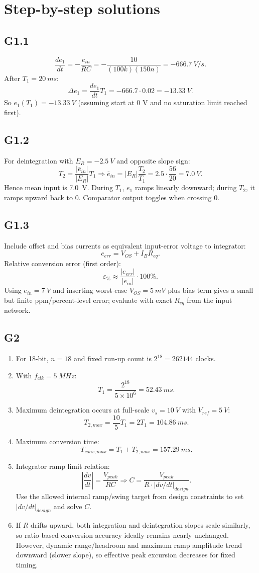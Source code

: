 \documentclass[12pt,a4paper]{article}
\begin{document}
\section{Step-by-step solutions}
\subsection{G1.1}
\[
\frac{de_1}{dt}=-\frac{e_{in}}{RC}=-\frac{10}{(100k)(150n)}=-\SI{666.7}{V/s}.
\]
After $T_1=\SI{20}{ms}$:
\[
\Delta e_1 = \frac{de_1}{dt}T_1=-666.7\cdot0.02=-\SI{13.33}{V}.
\]
So $e_1(T_1)=\SI{-13.33}{V}$ (assuming start at 0 V and no saturation limit reached first).

\subsection{G1.2}
For deintegration with $E_R=-\SI{2.5}{V}$ and opposite slope sign:
\[
T_2=\frac{|\bar e_{in}|}{|E_R|}T_1
\Rightarrow
\bar e_{in}=|E_R|\frac{T_2}{T_1}=2.5\cdot\frac{56}{20}=\SI{7.0}{V}.
\]
Hence mean input is \SI{7.0}{V}. During $T_1$, $e_1$ ramps linearly downward; during $T_2$, it ramps upward back to 0. Comparator output toggles when crossing 0.

\subsection{G1.3}
Include offset and bias currents as equivalent input-error voltage to integrator:
\[
e_{err}=V_{OS}+I_B R_{eq}.
\]
Relative conversion error (first order):
\[
\varepsilon_\%\approx\frac{|e_{err}|}{|e_{in}|}\cdot100\%.
\]
Using $e_{in}=\SI{7}{V}$ and inserting worst-case $V_{OS}=\SI{5}{mV}$ plus bias term gives a small but finite ppm/percent-level error; evaluate with exact $R_{eq}$ from the input network.

\subsection{G2}
\begin{enumerate}
\item For 18-bit, $n=18$ and fixed run-up count is $2^{18}=262144$ clocks.
\item With $f_{clk}=\SI{5}{MHz}$:
\[
T_1=\frac{2^{18}}{5\times10^6}=\SI{52.43}{ms}.
\]
\item Maximum deintegration occurs at full-scale $v_s=\SI{10}{V}$ with $V_{ref}=\SI{5}{V}$:
\[
T_{2,max}=\frac{10}{5}T_1=2T_1=\SI{104.86}{ms}.
\]
\item Maximum conversion time:
\[
T_{conv,max}=T_1+T_{2,max}=\SI{157.29}{ms}.
\]
\item Integrator ramp limit relation:
\[
\left|\frac{dv}{dt}\right|=\frac{V_{peak}}{RC} \Rightarrow C=\frac{V_{peak}}{R\cdot |dv/dt|_{design}}.
\]
Use the allowed internal ramp/swing target from design constraints to set $|dv/dt|_{design}$ and solve $C$.
\item If $R$ drifts upward, both integration and deintegration slopes scale similarly, so ratio-based conversion accuracy ideally remains nearly unchanged. However, dynamic range/headroom and maximum ramp amplitude trend downward (slower slope), so effective peak excursion decreases for fixed timing.
\end{enumerate}
\end{document}
